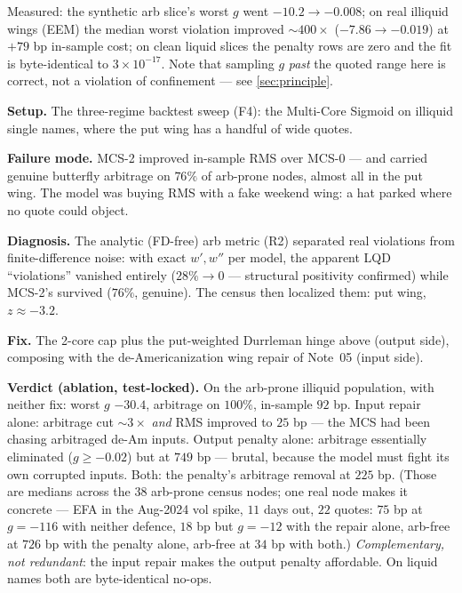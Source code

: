 \documentclass[11pt]{article}
\begin{document}
Measured: the synthetic arb slice's worst $g$ went $-10.2\to-0.008$; on real
illiquid wings (EEM) the median worst violation improved $\sim400\times$
($-7.86\to-0.019$) at $+79$ bp in-sample cost; on clean liquid slices the
penalty rows are zero and the fit is byte-identical to $3\times10^{-17}$.
Note that sampling $g$ \emph{past} the quoted range here is correct, not a
violation of confinement --- see \cref{sec:principle}.

\begin{example}[title={Case file: the MCS that invented a put wing}]
\textbf{Setup.} The three-regime backtest sweep (F4): the Multi-Core Sigmoid
on illiquid single names, where the put wing has a handful of wide quotes.

\textbf{Failure mode.} MCS-2 improved in-sample RMS over MCS-0 --- and
carried genuine butterfly arbitrage on $76\%$ of arb-prone nodes, almost all
in the put wing. The model was buying RMS with a fake weekend wing: a hat
parked where no quote could object.

\textbf{Diagnosis.} The analytic (FD-free) arb metric (R2) separated real
violations from finite-difference noise: with exact $w',w''$ per model, the
apparent LQD ``violations'' vanished entirely ($28\%\to0$ --- structural
positivity confirmed) while MCS-2's survived ($76\%$, genuine). The census
then localized them: put wing, $z\approx-3.2$.

\textbf{Fix.} The 2-core cap plus the put-weighted Durrleman hinge above
(output side), composing with the de-Americanization wing repair of Note~05
(input side).

\textbf{Verdict (ablation, test-locked).} On the arb-prone illiquid
population, with neither fix: worst $g$ $-30.4$, arbitrage on $100\%$,
in-sample $92$ bp. Input repair alone: arbitrage cut $\sim3\times$ \emph{and}
RMS improved to $25$ bp --- the MCS had been chasing arbitraged de-Am
inputs. Output penalty alone: arbitrage essentially eliminated
($g\ge-0.02$) but at $749$ bp --- brutal, because the model must fight its
own corrupted inputs. Both: the penalty's arbitrage removal at $225$ bp.
(Those are medians across the $38$ arb-prone census nodes; one real node
makes it concrete --- EFA in the Aug-2024 vol spike, $11$ days out, $22$
quotes: $75$ bp at $g=-116$ with neither defence, $18$ bp but $g=-12$ with
the repair alone, arb-free at $726$ bp with the penalty alone, arb-free at
$34$ bp with both.) \emph{Complementary, not redundant}: the input repair
makes the output penalty affordable. On liquid names both are byte-identical
no-ops.
\end{example}
\end{document}
